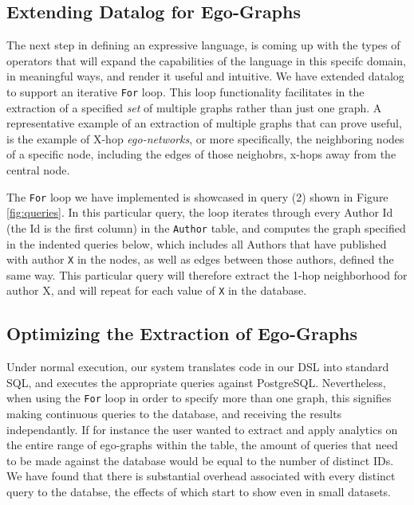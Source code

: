 \documentclass[11pt,letterpaper]{article}
\begin{document}
\subsection*{Extending Datalog for Ego-Graphs}

The next step in defining an expressive language, is coming up with the types of operators that will expand the capabilities of the language in this specifc domain, in meaningful ways, and render it useful and intuitive. We have extended datalog to support an iterative \texttt{For} loop. This loop functionality facilitates in the extraction of a specified \textit{set} of multiple graphs rather than just one graph. A representative example of an  extraction of multiple graphs that can prove useful, is the example of X-hop \textit{ego-networks}, or more specifically, the neighboring nodes of a specific node, including the edges of those neighobrs, x-hops away from the central node.

The \texttt{For} loop we have implemented is showcased in query (2) shown in Figure \ref{fig:queries}. In this particular query, the loop iterates through every Author Id (the Id is the first column) in the \texttt{Author} table, and computes the graph specified in the indented queries below, which includes all Authors that have published with author \texttt{X} in the nodes, as well as edges between those authors, defined the same way. This particular query will therefore extract the 1-hop neighborhood for author X, and will repeat for each value of \texttt{X} in the database.

\subsection*{Optimizing the Extraction of Ego-Graphs}

Under normal execution, our system translates code in our DSL into standard SQL, and executes the appropriate queries against PostgreSQL. Nevertheless, when using the \texttt{For} loop in order to specify more than one graph, this signifies making continuous queries to the database, and receiving the results independantly. If for instance the user wanted to extract and apply analytics on the entire range of ego-graphs within the table, the amount of queries that need to be made against the database would be equal to the number of distinct IDs. We have found that there is substantial overhead associated with every distinct query to the databse, the effects of which start to show even in small datasets.
\end{document}
